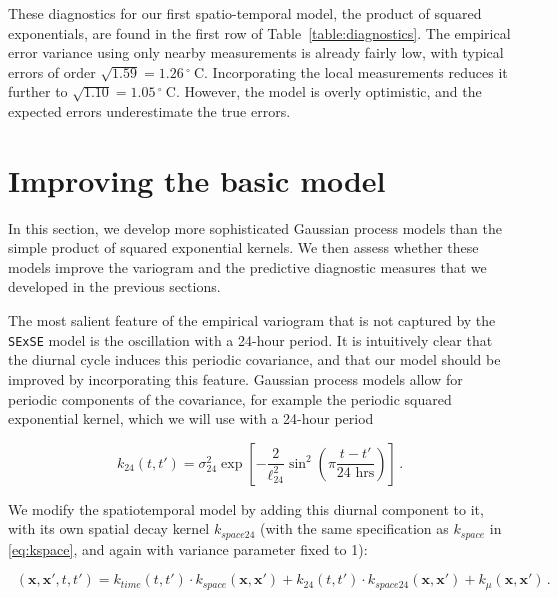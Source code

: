 \documentclass[letter]{article}
\newcommand{\genericdel}[3]{%
      \left#1#3\right#2
    }
\newcommand{\del}[1]{\genericdel(){#1}}
\newcommand{\sbr}[1]{\genericdel[]{#1}}
\newcommand{\xvec}{\mathbold{x}}
\newcommand{\degreeC}{{}^{\circ}~\mathrm{C}}
\DeclareMathOperator{\kdiurn}{k_{\mathtt{SESE_{24}}}}
\begin{document}
These diagnostics for our first spatio-temporal model, the product of squared exponentials, are found in the first row of Table~\ref{table:diagnostics}. The empirical error variance using only nearby measurements is already fairly low, with typical errors of order \(\sqrt{1.59}=1.26\,\degreeC\). Incorporating the local measurements reduces it further to \(\sqrt{1.10}=1.05\,\degreeC\). However, the model is overly optimistic, and the expected errors underestimate the true errors.
    


        \section{Improving the basic model}\label{improving-the-basic-model}
    

\label{sec:improving_model}
        In this section, we develop more sophisticated Gaussian process models than the simple product of squared exponential kernels. We then assess whether these models improve the variogram and the predictive diagnostic measures that we developed in the previous sections.

The most salient feature of the empirical variogram that is not captured by the \texttt{SExSE} model is the oscillation with a 24-hour period.
It is intuitively clear that the diurnal cycle induces this periodic covariance, and that our model should be improved by incorporating this feature.
Gaussian process models allow for periodic components of the covariance, for example the periodic squared exponential kernel, which we will use with a 24-hour period

\begin{equation}
    k_{24}(t,t') = \sigma_{24}^2 \exp\sbr{ - \frac{2}{\ell_{24}^2} \sin^2\del{
        \pi \frac{t-t'}{\text{24 hrs}} 
        }}\,.
\end{equation}

We modify the spatiotemporal model by adding this diurnal component to it, with its own spatial decay kernel \(k_{space24}\) (with the same specification as \(k_{space}\) in \eqref{eq:kspace}, and again with variance parameter fixed to 1):

\begin{equation}
    \kdiurn(\xvec,\xvec',t,t') = k_{time}(t,t') \cdot k_{space}(\xvec, \xvec') 
        + k_{24}(t,t') \cdot k_{space24}(\xvec, \xvec')
        + k_\mu(\xvec, \xvec') 
        \,.
\end{equation}
    
\end{document}

